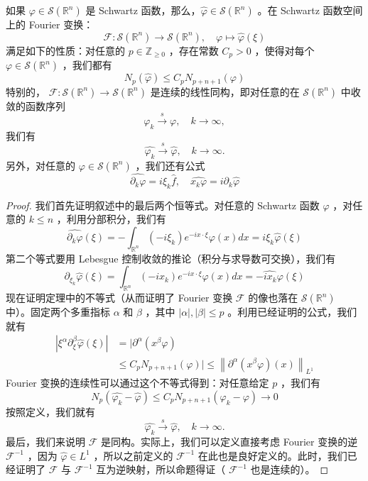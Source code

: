 \begin{theorem}
如果 $\varphi \in \mathcal{S}\left(\mathbb{R}^n\right)$ 是 Schwartz 函数，那么，$\widehat{\varphi} \in \mathcal{S}\left(\mathbb{R}^n\right)$ 。在 Schwartz 函数空间上的 Fourier 变换：
\[
\mathcal{F}: \mathcal{S}\left(\mathbb{R}^n\right) \longrightarrow \mathcal{S}\left(\mathbb{R}^n\right), \quad \varphi \mapsto \widehat{\varphi}(\xi)
\]满足如下的性质：对任意的 $p \in \mathbb{Z}_{\geqslant 0}$ ，存在常数 $C_p>0$ ，使得对每个 $\varphi \in \mathcal{S}\left(\mathbb{R}^n\right)$ ，我们都有
\[
N_p(\widehat{\varphi}) \leqslant C_p N_{p+n+1}(\varphi)
\]特别的， $\mathcal{F}: \mathcal{S}\left(\mathbb{R}^n\right) \longrightarrow \mathcal{S}\left(\mathbb{R}^n\right)$ 是连续的线性同构，即对任意的在 $\mathcal{S}\left(\mathbb{R}^n\right)$ 中收敛的函数序列
\[
\varphi_k \xrightarrow{s} \varphi, \quad k \rightarrow \infty,
\]我们有
\[
\widehat{\varphi_k} \xrightarrow{s} \widehat{\varphi}, \quad k \rightarrow \infty .
\]另外，对任意的 $\varphi \in \mathcal{S}\left(\mathbb{R}^n\right)$ ，我们还有公式
\[
\widehat{\partial_k \varphi}=i \xi_k \widehat{f}, \quad \widehat{x_k \varphi}=i \partial_k \widehat{\varphi}
\]
\end{theorem}
\begin{proof}
我们首先证明叙述中的最后两个恒等式。对任意的 Schwartz 函数 $\varphi$ ，对任意的 $k \leqslant n$ ，利用分部积分，我们有
\[
\widehat{\partial_k \varphi}(\xi)=-\int_{\mathbb{R}^n}\left(-i \xi_k\right) e^{-i x \cdot \xi} \varphi(x) d x=i \xi_k \widehat{\varphi}(\xi)
\]
第二个等式要用 Lebesgue 控制收敛的推论（积分与求导数可交换），我们有
\[
\partial_{\xi_k} \widehat{\varphi}(\xi)=\int_{\mathbb{R}^n}\left(-i x_k\right) e^{-i x \cdot \xi} \varphi(x) d x=\widehat{-i x_k \varphi}(\xi)
\]
现在证明定理中的不等式（从而证明了 Fourier 变换 $\mathcal{F}$ 的像也落在 $\mathcal{S}\left(\mathbb{R}^n\right)$ 中）。固定两个多重指标 $\alpha$ 和 $\beta$ ，其中 $|\alpha|,|\beta| \leqslant p$ 。利用已经证明的公式，我们就有
\[
\begin{aligned}
\left|\xi^\alpha \partial_{\xi}^\beta \widehat{\varphi}(\xi)\right| & =\mid \partial^\alpha\left(x^\beta \varphi\right) \\
& \leqslant C_p N_{p+n+1}(\varphi) \mid \leqslant\left\|\partial^\alpha\left(x^\beta \varphi\right)(x)\right\|_{L^1}
\end{aligned}
\]
Fourier 变换的连续性可以通过这个不等式得到：对任意给定 $p$ ，我们有
\[
N_p\left(\widehat{\varphi_k}-\widehat{\varphi}\right) \leqslant C_p N_{p+n+1}\left(\varphi_k-\varphi\right) \rightarrow 0
\]
按照定义，我们就有
\[
\widehat{\varphi_k} \xrightarrow{s} \widehat{\varphi}, \quad k \rightarrow \infty .
\]
最后，我们来说明 $\mathcal{F}$ 是同构。实际上，我们可以定义直接考虑 Fourier 变换的逆 $\mathcal{F}^{-1}$ ，因为 $\widehat{\varphi} \in L^1$ ，所以之前定义的 $\mathcal{F}^{-1}$ 在此也是良好定义的。此时，我们已经证明了 $\mathcal{F}$ 与 $\mathcal{F}^{-1}$ 互为逆映射，所以命题得证（ $\mathcal{F}^{-1}$ 也是连续的）。
\end{proof}

